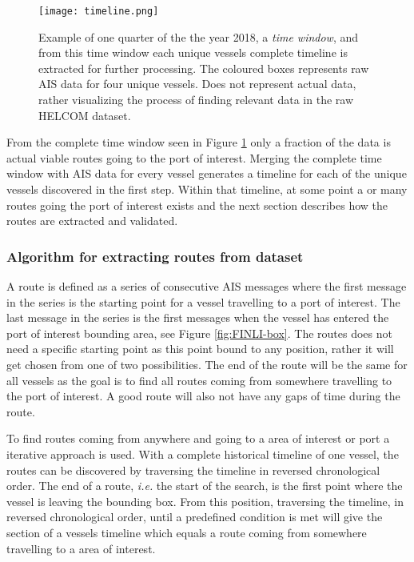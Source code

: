 \documentclass[../main.tex]{subfiles}
\begin{document}
\begin{figure}[H]
	\centering
	\texttt{[image: timeline.png]}
	\caption{Example of one quarter of the the year 2018, a \textit{time window}, and from this time window each unique vessels complete timeline is extracted for further processing. The coloured boxes represents raw AIS data for four unique vessels. Does not represent actual data, rather visualizing the process of finding relevant data in the raw HELCOM dataset.}
	\label{fig:timeline}
\end{figure}

From the complete time window seen in Figure \ref{fig:timeline} only a fraction of the data is actual viable routes going to the port of interest. Merging the complete time window with AIS data for every vessel generates a timeline for each of the unique vessels discovered in the first step. Within that timeline, at some point a or many routes going the port of interest exists and the next section describes how the routes are extracted and validated.

\subsubsection{Algorithm for extracting routes from dataset}
\label{sec:algo-section}
A route is defined as a series of consecutive AIS messages where the first message in the series is the starting point for a vessel travelling to a port of interest. The last message in the series is the first messages when the vessel has entered the port of interest bounding area, see Figure \ref{fig:FINLI-box}. The routes does not need a specific starting point as this point bound to any position, rather it will get chosen from one of two possibilities. The end of the route will be the same for all vessels as the goal is to find all routes coming from somewhere travelling to the port of interest. A good route will also not have any gaps of time during the route.

To find routes coming from anywhere and going to a area of interest or port a iterative approach is used. With a complete historical timeline of one vessel, the routes can be discovered by traversing the timeline in reversed chronological order. The end of a route, \textit{i.e.} the start of the search, is the first point where the vessel is leaving the bounding box. From this position, traversing the timeline, in reversed chronological order, until a predefined condition is met will give the section of a vessels timeline which equals a route coming from somewhere travelling to a area of interest.
\end{document}
